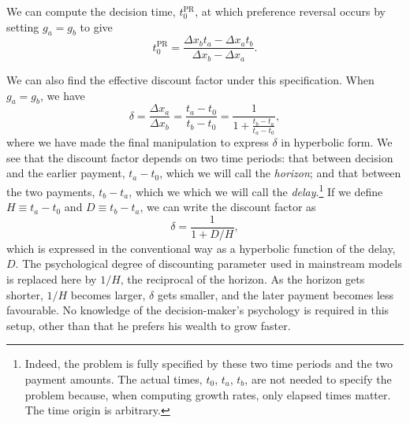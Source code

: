 \documentclass[11pt]{article}
\newcommand{\elabel}[1]{\label{eq:#1}}
\newcommand{\be}{\begin{equation}}
\newcommand{\ee}{\end{equation}}
\newcommand{\Dx}{\Delta x}
\newcommand{\del}{D}
\newcommand{\hor}{H}
\numberwithin{equation}{section}
\begin{document}
We can compute the decision time, $t_0^\text{PR}$, at which preference reversal occurs by setting $g_a=g_b$ to give
\be
t_0^\text{PR} = \frac{\Dx_b t_a - \Dx_a t_b}{\Dx_b - \Dx_a}.
\elabel{t0PR}
\ee

We can also find the effective discount factor under this specification. When $g_a=g_b$, we have
\be
\delta = \frac{\Dx_a}{\Dx_b} = \frac{t_a-t_0}{t_b-t_0} = \frac{1}{1+\frac{t_b-t_a}{t_a-t_0}},
\ee
where we have made the final manipulation to express $\delta$ in hyperbolic form. We see that the discount factor depends on two time periods: that between decision and the earlier payment, $t_a-t_0$, which we will call the \textit{horizon}; and that between the two payments, $t_b-t_a$, which we which we will call the \textit{delay}.\footnote{Indeed, the problem is fully specified by these two time periods and the two payment amounts. The actual times, $t_0$, $t_a$, $t_b$, are not needed to specify the problem because, when computing growth rates, only elapsed times matter. The time origin is arbitrary.} If we define $\hor\equiv t_a-t_0$ and $\del\equiv t_b-t_a$, we can write the discount factor as
\be
\delta = \frac{1}{1+\del/\hor},
\ee
which is expressed in the conventional way as a hyperbolic function of the delay, $\del$. The psychological degree of discounting parameter used in mainstream models is replaced here by $1/\hor$, the reciprocal of the horizon. As the horizon gets shorter, $1/\hor$ becomes larger, $\delta$ gets smaller, and the later payment becomes less favourable. No knowledge of the decision-maker's psychology is required in this setup, other than that he prefers his wealth to grow faster.
\end{document}
